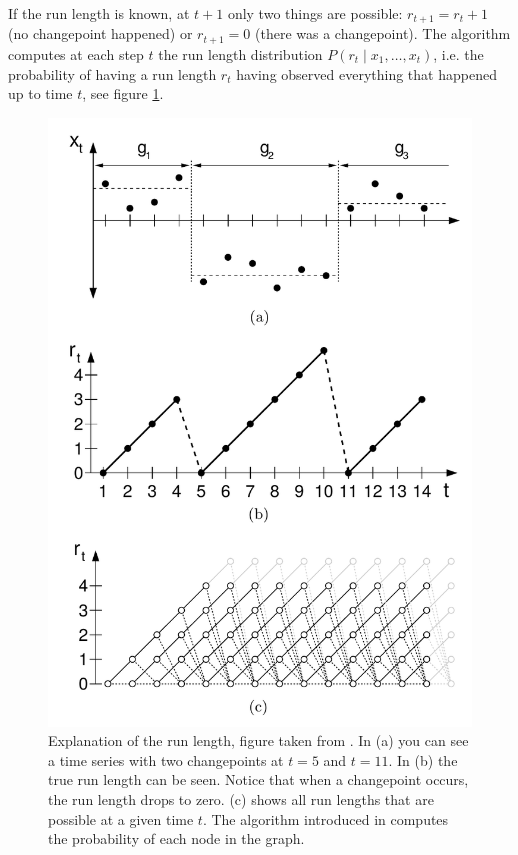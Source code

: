 \documentclass[12pt,a4paper]{article}
\begin{document}
If the run length is known, at $t+1$ only two things are possible: $r_{t+1}=r_t + 1$ (no changepoint happened) or $r_{t+1}=0$ (there was a changepoint). The algorithm computes at each step $t$ the run length distribution $P(r_t \mid x_1,\dots,x_t)$, i.e. the probability of having a run length $r_t$ having observed everything that happened up to time $t$, see figure \ref{fig:runlength_example}.

\begin{figure}
	\centering
	\includegraphics{images/runlength_example.png}
	\caption{Explanation of the run length, figure taken from \cite{Adams:BayesianOnlineChangepoint}. In (a) you can see a time series with two changepoints at $t=5$ and $t=11$. In (b) the true run length can be seen. Notice that when a changepoint occurs, the run length drops to zero. (c) shows all run lengths that are possible at a given time $t$. The algorithm introduced in \cite{Adams:BayesianOnlineChangepoint} computes the probability of each node in the graph.}
	\label{fig:runlength_example}
\end{figure}
\end{document}
